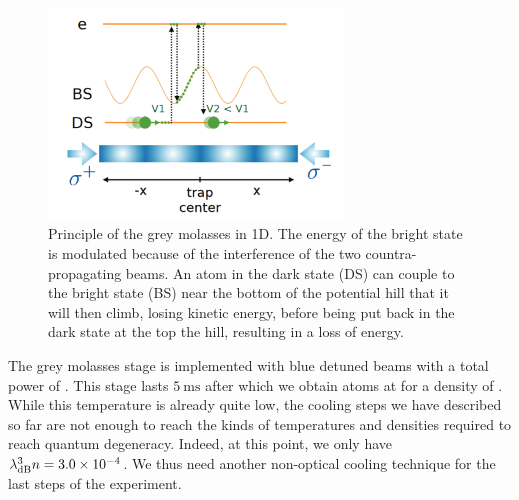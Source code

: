 \begin{figure}
    \centering
    \includegraphics[width=0.7\textwidth]{Fig/Chapter3/grey_molasses.png}
    \caption{Principle of the grey molasses in 1D. The energy of the bright state is modulated because of the interference of the two countra-propagating beams. An atom in the dark state (DS) can couple to the bright state (BS) near the bottom of the potential hill that it will then climb, losing kinetic energy, before being put back in the dark state at the top the hill, resulting in a loss of energy.}
    \label{fig:grey_molasses}
\end{figure}

The grey molasses stage is implemented with blue detuned  beams with a total power of . This stage lasts $5 \ \mathrm{ms}$ after which we obtain  atoms at  for a density of . While this temperature is already quite low, the cooling steps we have described so far are not enough to reach the kinds of temperatures and densities required to reach quantum degeneracy. Indeed, at this point, we only have $\lambda_{\rm{dB}}^3 n = 3.0 \times 10^{-4}$. We thus need another non-optical cooling technique for the last steps of the experiment.

